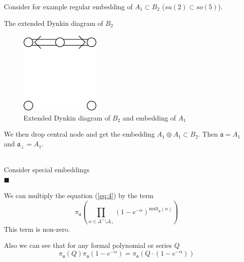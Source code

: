 \documentclass[a4paper,12pt]{article}
\theoremstyle{definition} \newtheorem{Def}{Definition}
\newenvironment{comment}
{\par\noindent{\bf TODO}\\}
{\\\hfill$\scriptstyle\blacksquare$\par}
\begin{document}
Consider for example regular embedding of $A_1\subset B_2$ ($su(2)\subset so(5)$). 

The extended Dynkin diagram of $B_2$ 
\begin{figure}[ph]
  \centering
  \includegraphics[width=40mm]{B2_A1_diagram.pdf}
  \caption{Extended Dynkin diagram of $B_2$ and embedding of $A_1$}
  \label{fig:B2Dynkin}
\end{figure}
We then drop central node and get the embedding $A_1\oplus A_1\subset B_2$. Then $\mathfrak{a}=A_1$ and $\mathfrak{a}_{\bot}=A_1$.
\begin{comment}
  Consider special embeddings
\end{comment}

We can multiply the equation (\ref{eq:4}) by the term
\begin{equation}
  \label{eq:5}
  \pi_{\mathfrak{a}}\left(\prod_{\alpha\in \Delta^{+}\setminus \Delta_{\bot}}(1-e^{-\alpha})^{\mathrm{mult}_{\mathfrak{g}}(\alpha)} \right)
\end{equation}
This term is non-zero. 

Also we can see that for any formal polynomial or series $Q$
\begin{equation}
  \label{eq:6}
  \pi_{\mathfrak{a}} (Q) \pi_{\mathfrak{a}}(1-e^{-\alpha})=\pi_{\mathfrak{a}}\left(Q\cdot (1-e^{-\alpha})\right)
\end{equation}
\end{document}
